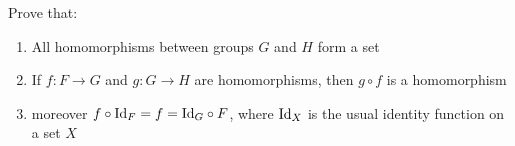 \begin{exercise}
  Prove that:
    \begin{enumerate}
      \item All homomorphisms between groups $G$ and $H$ form a set
      \item If $f: F\to G$ and $g: G\to H$ are homomorphisms, then $g\circ f$ is a homomorphism
      \item moreover $f\circ \text{Id}_F=f=\text{Id}_G\circ F$, where $\text{Id}_X$ is the usual identity function on a set $X$
    \end{enumerate}
\end{exercise}




